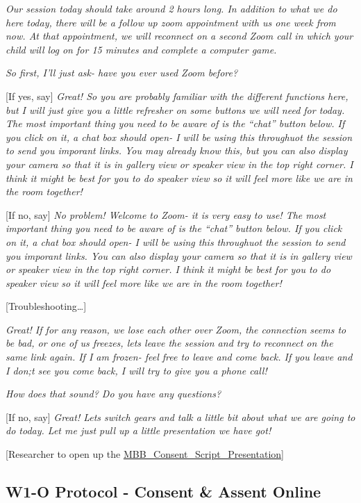 \documentclass[]{book}
\begin{document}
\emph{Our session today should take around 2 hours long. In addition to what we do here today, there will be a follow up zoom appointment with us one week from now. At that appointment, we will reconnect on a second Zoom call in which your child will log on for 15 minutes and complete a computer game.}

\emph{So first, I'll just ask- have you ever used Zoom before?}

{[}If yes, say{]} \emph{Great! So you are probably familiar with the different functions here, but I will just give you a little refresher on some buttons we will need for today. The most important thing you need to be aware of is the ``chat'' button below. If you click on it, a chat box should open- I will be using this throughuot the session to send you imporant links. You may already know this, but you can also display your camera so that it is in gallery view or speaker view in the top right corner. I think it might be best for you to do speaker view so it will feel more like we are in the room together!}

{[}If no, say{]} \emph{No problem! Welcome to Zoom- it is very easy to use! The most important thing you need to be aware of is the ``chat'' button below. If you click on it, a chat box should open- I will be using this throughuot the session to send you imporant links. You can also display your camera so that it is in gallery view or speaker view in the top right corner. I think it might be best for you to do speaker view so it will feel more like we are in the room together!}

{[}Troubleshooting\ldots{}{]}

\emph{Great! If for any reason, we lose each other over Zoom, the connection seems to be bad, or one of us freezes, lets leave the session and try to reconnect on the same link again. If I am frozen- feel free to leave and come back. If you leave and I don;t see you come back, I will try to give you a phone call!}

\emph{How does that sound? Do you have any questions?}

{[}If no, say{]} \emph{Great! Lets switch gears and talk a little bit about what we are going to do today. Let me just pull up a little presentation we have got!}

{[}Researcher to open up the \href{https://ucla.app.box.com/file/729637683371?sb=/activity}{MBB\_Consent\_Script\_Presentation}{]}

\hypertarget{w1-o-protocol---consent-assent-online}{%
\subsection{W1-O Protocol - Consent \& Assent Online}\label{w1-o-protocol---consent-assent-online}}
\end{document}

